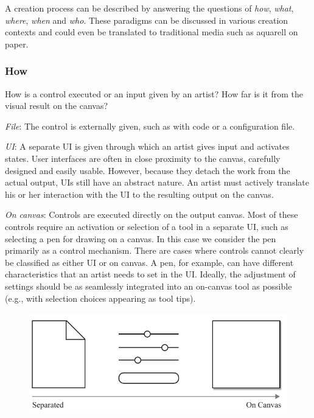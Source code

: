 A creation process can be described by answering the questions of \textit{how}, \textit{what}, \textit{where}, \textit{when} and \textit{who}. These paradigms can be discussed in various creation contexts and could even be translated to traditional media such as aquarell on paper.

\subsubsection{How}

How is a control executed or an input given by an artist? How far is it from the visual result on the canvas?


\textit{File}: The control is externally given, such as with code or a configuration file.

\textit{UI}: A separate UI is given through which an artist gives input and activates states. User interfaces are often in close proximity to the canvas, carefully designed and easily usable. However, because they detach the work from the actual output, UIs still have an abstract nature. An artist must actively translate his or her interaction with the UI to the resulting output on the canvas.

\textit{On canvas}: Controls are executed directly on the output canvas. Most of these controls require an activation or selection of a tool in a separate UI, such as selecting a pen for drawing on a canvas. In this case we consider the pen primarily as a control mechanism. There are cases where controls cannot clearly be classified as either UI or on canvas. A pen, for example, can have different characteristics that an artist needs to set in the UI. Ideally, the adjustment of settings should be as seamlessly integrated into an on-canvas tool as possible (e.g., with selection choices appearing as tool tips).

\begin{figure}[H]
    \centering
        \includegraphics[width=\controlParamsFigWidth\linewidth]{figures/control_paradigms/how.pdf}
\end{figure}


